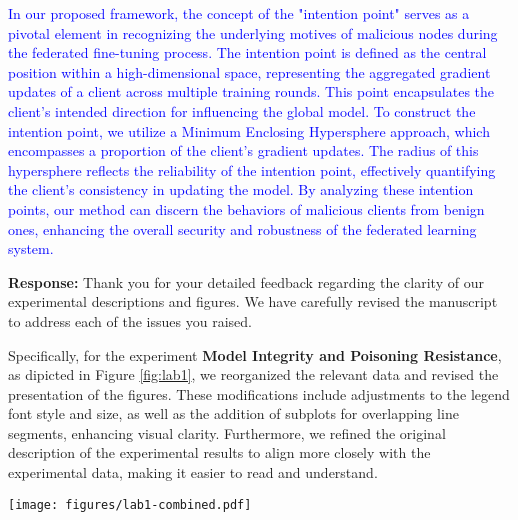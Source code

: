 \documentclass[a4paper,twoside,11pt,dvipsnames]{reviewresponse}
\begin{document}
\textcolor{blue}{In our proposed framework, the concept of the "intention point" serves as a pivotal element in recognizing the underlying motives of malicious nodes during the federated fine-tuning process. The intention point is defined as the central position within a high-dimensional space, representing the aggregated gradient updates of a client across multiple training rounds. This point encapsulates the client's intended direction for influencing the global model. To construct the intention point, we utilize a Minimum Enclosing Hypersphere approach, which encompasses a proportion of the client’s gradient updates. The radius of this hypersphere reflects the reliability of the intention point, effectively quantifying the client's consistency in updating the model. By analyzing these intention points, our method can discern the behaviors of malicious clients from benign ones, enhancing the overall security and robustness of the federated learning system.}

\textbf{Response:} 
Thank you for your detailed feedback regarding the clarity of our experimental descriptions and figures. We have carefully revised the manuscript to address each of the issues you raised. 

Specifically, for the experiment \textbf{Model Integrity and Poisoning Resistance}, as dipicted in Figure \ref{fig:lab1}, we reorganized the relevant data and revised the presentation of the figures. These modifications include adjustments to the legend font style and size, as well as the addition of subplots for overlapping line segments, enhancing visual clarity. Furthermore, we refined the original description of the experimental results to align more closely with the experimental data, making it easier to read and understand.

\begin{figure*}[!ht]
    \centering
    \texttt{[image: figures/lab1-combined.pdf]}
    \caption{ASR and TSR of various defense mechanisms (FedAVG, FLTrust, Foolsgold, Flame, SecFFT) under three attacks (MR, NEUR, EDGE CASE).}
    \label{fig:lab1}
\end{figure*}
\end{document}
